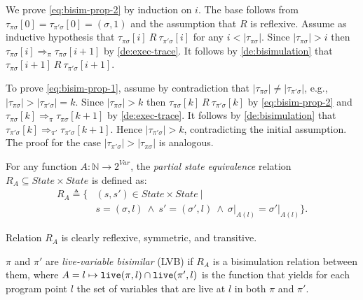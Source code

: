 \begin{myproof}
We prove \eqref{eq:bisim-prop-2} by induction on $i$. The base follows from $\tau_{\pi\sigma}[0]=\tau_{\pi'\sigma}[0]=(\sigma,1)$ and the assumption that $R$ is reflexive. Assume as inductive hypothesis that $\tau_{\pi\sigma}[i]~R~\tau_{\pi'\sigma}[i]$ for any $i<|\tau_{\pi\sigma}|$. Since $|\tau_{\pi\sigma}|>i$ then $\tau_{\pi\sigma}[i] \Rightarrow_{\pi} \tau_{\pi\sigma}[i+1]$ by \ref{de:exec-trace}. It follows by \ref{de:bisimulation} that $\tau_{\pi\sigma}[i+1]~R~\tau_{\pi'\sigma}[i+1]$. 

To prove \eqref{eq:bisim-prop-1}, assume by contradiction that $|\tau_{\pi\sigma}|\neq|\tau_{\pi'\sigma}|$, e.g., $|\tau_{\pi\sigma}|>|\tau_{\pi'\sigma}|=k$. Since $|\tau_{\pi\sigma}|>k$ then $\tau_{\pi\sigma}[k]~R~\tau_{\pi'\sigma}[k]$ by \eqref{eq:bisim-prop-2} and $\tau_{\pi\sigma}[k] \Rightarrow_{\pi} \tau_{\pi\sigma}[k+1]$ by \ref{de:exec-trace}. It follows by \ref{de:bisimulation} that $\tau_{\pi'\sigma}[k] \Rightarrow_{\pi'} \tau_{\pi'\sigma}[k+1]$. Hence $|\tau_{\pi'\sigma}|>k$, contradicting the initial assumption. The proof for the case $|\tau_{\pi'\sigma}|>|\tau_{\pi\sigma}|$ is analogous.
\end{myproof}

\begin{definition}
\label{de:state-equiv-relation}
For any function $A:\mathbb{N}\rightarrow 2^{Var}$, the {\em partial state equivalence} relation $R_A\subseteq State\times State$ is defined as:
\begin{equation*}
\begin{split}
R_A\triangleq\{ & (s, s')\in State\times State ~ | ~  \\
& s=(\sigma,l) ~ \wedge ~ s'=(\sigma',l) ~ \wedge ~ \sigma\vert_{A(l)} = \sigma'\vert_{A(l)} \}.
\end{split}
\end{equation*}
\end{definition}

\noindent Relation $R_A$ is clearly reflexive, symmetric, and transitive.

\begin{definition}
\label{de:lvb-programs}
$\pi$ and $\pi'$ are {\em live-variable bisimilar} (LVB) if $R_{A}$ is a bisimulation relation between them, where $A=l\mapsto\text{${\tt live}$}(\pi,l)\cap \text{${\tt live}$}(\pi',l)$ is the function that yields for each program point $l$ the set of variables that are live at $l$ in both $\pi$ and $\pi'$.
\end{definition}

